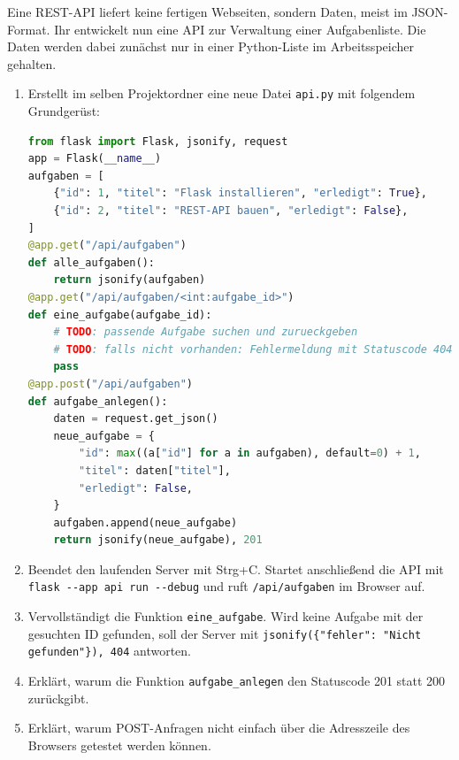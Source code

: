 \documentclass[11pt, a4paper, oneside]{article}
\begin{document}
    \lines[9cm]
    
	
	
	Eine REST-API liefert keine fertigen Webseiten, sondern Daten, meist im JSON-Format.
	Ihr entwickelt nun eine API zur Verwaltung einer Aufgabenliste.
	Die Daten werden dabei zunächst nur in einer Python-Liste im Arbeitsspeicher gehalten.
	
	\begin{enumerate}[label=\alph*)]
		\item Erstellt im selben Projektordner eine neue Datei \texttt{api.py} mit folgendem Grundgerüst:
        \begin{lstlisting}[language=python]
from flask import Flask, jsonify, request
app = Flask(__name__)
aufgaben = [
    {"id": 1, "titel": "Flask installieren", "erledigt": True},
    {"id": 2, "titel": "REST-API bauen", "erledigt": False},
]
@app.get("/api/aufgaben")
def alle_aufgaben():
    return jsonify(aufgaben)
@app.get("/api/aufgaben/<int:aufgabe_id>")
def eine_aufgabe(aufgabe_id):
    # TODO: passende Aufgabe suchen und zurueckgeben
    # TODO: falls nicht vorhanden: Fehlermeldung mit Statuscode 404
    pass
@app.post("/api/aufgaben")
def aufgabe_anlegen():
    daten = request.get_json()
    neue_aufgabe = {
        "id": max((a["id"] for a in aufgaben), default=0) + 1,
        "titel": daten["titel"],
        "erledigt": False,
    }
    aufgaben.append(neue_aufgabe)
    return jsonify(neue_aufgabe), 201
        \end{lstlisting}

		\item Beendet den laufenden Server mit Strg+C.
		Startet anschließend die API mit \lstinline{flask --app api run --debug} und ruft \lstinline{/api/aufgaben} im Browser auf.

		\item Vervollständigt die Funktion \texttt{eine\_aufgabe}.
		Wird keine Aufgabe mit der gesuchten ID gefunden, soll der Server mit \texttt{jsonify(\{"fehler": "Nicht gefunden"\}), 404} antworten.

		\item Erklärt, warum die Funktion \texttt{aufgabe\_anlegen} den Statuscode 201 statt 200 zurückgibt.
		\item Erklärt, warum POST-Anfragen nicht einfach über die Adresszeile des Browsers getestet werden können.
	\end{enumerate}

    \pagebreak
    \lines[7cm]
	
\end{document}
